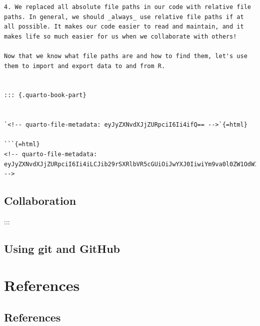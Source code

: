 \documentclass[
  letterpaper,
  DIV=11,
  numbers=noendperiod]{scrreprt}
\begin{document}
\begin{verbatim}
4. We replaced all absolute file paths in our code with relative file paths. In general, we should _always_ use relative file paths if at all possible. It makes our code easier to read and maintain, and it makes life so much easier for us when we collaborate with others! 

Now that we know what file paths are and how to find them, let's use them to import and export data to and from R.


::: {.quarto-book-part}


`<!-- quarto-file-metadata: eyJyZXNvdXJjZURpciI6Ii4ifQ== -->`{=html}

```{=html}
<!-- quarto-file-metadata: eyJyZXNvdXJjZURpciI6Ii4iLCJib29rSXRlbVR5cGUiOiJwYXJ0IiwiYm9va0l0ZW1OdW1iZXIiOm51bGwsImJvb2tJdGVtRGVwdGgiOjB9 -->
\end{verbatim}

\chapter{Collaboration}\label{collaboration}

:::

\chapter{Using git and GitHub}\label{sec-using-git-and-github}

\part{References}

\chapter{References}\label{references-1}
\end{document}
